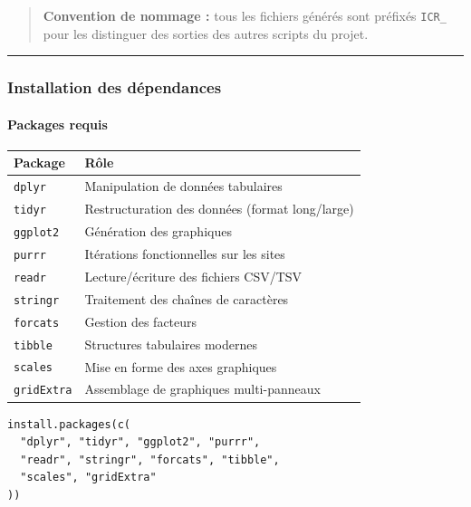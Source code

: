 \begin{quote}
\textbf{Convention de nommage :} tous les fichiers générés sont préfixés
\texttt{ICR\_} pour les distinguer des sorties des autres scripts du
projet.
\end{quote}

\begin{center}\rule{0.5\linewidth}{0.5pt}\end{center}

\subsubsection{Installation des
dépendances}\label{installation-des-duxe9pendances}

\paragraph{Packages requis}\label{packages-requis-1}

{\def\LTcaptype{none} %
\begin{longtable}[]{@{}ll@{}}
\toprule\noalign{}
Package & Rôle \\
\midrule\noalign{}
\endhead
\bottomrule\noalign{}
\endlastfoot
\texttt{dplyr} & Manipulation de données tabulaires \\
\texttt{tidyr} & Restructuration des données (format long/large) \\
\texttt{ggplot2} & Génération des graphiques \\
\texttt{purrr} & Itérations fonctionnelles sur les sites \\
\texttt{readr} & Lecture/écriture des fichiers CSV/TSV \\
\texttt{stringr} & Traitement des chaînes de caractères \\
\texttt{forcats} & Gestion des facteurs \\
\texttt{tibble} & Structures tabulaires modernes \\
\texttt{scales} & Mise en forme des axes graphiques \\
\texttt{gridExtra} & Assemblage de graphiques multi-panneaux \\
\end{longtable}
}

\begin{verbatim}
install.packages(c(
  "dplyr", "tidyr", "ggplot2", "purrr",
  "readr", "stringr", "forcats", "tibble",
  "scales", "gridExtra"
))
\end{verbatim}

